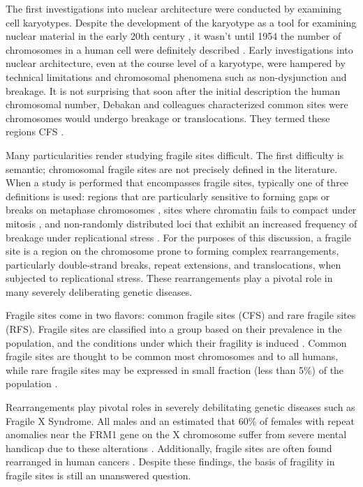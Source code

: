 The first investigations into nuclear architecture were conducted by examining cell karyotypes.  Despite the development of the karyotype as a
tool for examining nuclear material in the early 20th century \citep{levitsky1924}, it wasn't until 1954 the number of chromosomes in a human
cell were definitely described \citep{tjio1956}.  Early investigations into nuclear architecture, even at the course level of a karyotype, were
hampered by technical limitations and chromosomal phenomena such as non-dysjunction and breakage.  It is not surprising that soon after the
initial description the human chromosomal number, Debakan and colleagues characterized common sites were chromosomes would undergo breakage or
translocations.  They termed these regions \gls{CFS} \citep{leyden2008}.

Many particularities render studying fragile sites difficult.  The first difficulty is semantic; chromosomal fragile sites are not precisely
defined in the literature.  When a study is performed that encompasses fragile sites, typically one of three definitions is used: regions
that are particularly sensitive to forming gaps or breaks on metaphase chromosomes \citep{glover2005}, sites where chromatin fails to compact
under mitosis \citep{leyden2008}, and non-randomly distributed loci that exhibit an increased frequency of breakage under replicational
stress \citep{franchitto2013}.  For the purposes of this discussion, a \gls{fragile site} is a region on the chromosome prone to
forming complex rearrangements, particularly double-strand breaks, repeat extensions, and translocations, when subjected to replicational stress.
These rearrangements play a pivotal role in many severely deliberating genetic diseases.

Fragile sites come in two flavors: common fragile sites (CFS) and rare fragile sites (RFS).  Fragile sites are classified into a group based on their
prevalence in the population, and the conditions under which their fragility is induced \citep{leyden2008}.  Common fragile sites are thought to be common
most chromosomes and to all humans, while rare fragile sites may be expressed in small fraction (less than 5\%) of the population \citep{wells2006}.

Rearrangements play pivotal roles in severely debilitating genetic diseases such as Fragile X Syndrome.  All males and an estimated that 60\% of females
with repeat anomalies near the FRM1 gene on the X chromosome suffer from severe mental handicap due to these alterations \citep{sutherland1995}. Additionally,
fragile sites are often found rearranged in human cancers \citep{glover2005}.  Despite these findings, the basis of fragility in fragile sites is still an
unanswered question.
